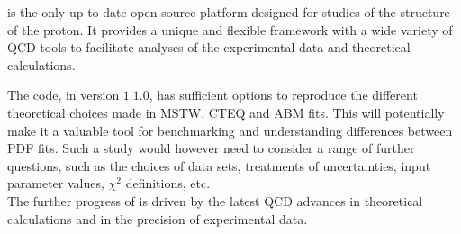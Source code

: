 
\label{sec:summary}
\fitter is the only up-to-date open-source platform designed for studies of the structure of the proton.
It provides a unique and flexible framework with a wide variety of QCD tools to 
facilitate analyses of the experimental data and theoretical calculations. 

The \fitter code, in version $1.1.0$, has sufficient options to reproduce the different 
theoretical choices made in MSTW, CTEQ and ABM fits. This will potentially make it a  
valuable tool for benchmarking and understanding differences between PDF fits. 
Such a study would however need to consider a range of further questions, such as the choices of
data sets, treatments of uncertainties, input parameter values, $\chi^2$ definitions, etc. 
\\
The further progress of \fitter is driven by the latest QCD advances in theoretical calculations 
and in the precision of experimental data.




